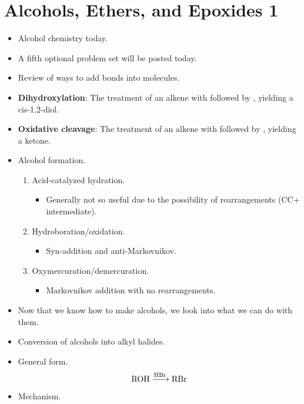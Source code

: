 \documentclass[../notes.tex]{subfiles}
\begin{document}
\section{Alcohols, Ethers, and Epoxides 1}
\begin{itemize}
    \item {}Alcohol chemistry today.
    \item A fifth optional problem set will be posted today.
    \item Review of ways to add  bonds into molecules.
    \item \textbf{Dihydroxylation}: The treatment of an alkene with  followed by , yielding a cis-1,2-diol.
    \item \textbf{Oxidative cleavage}: The treatment of an alkene with  followed by , yielding a ketone.
    \item Alcohol formation.
    \begin{enumerate}
        \item Acid-catalyzed hydration.
        \begin{itemize}
            \item Generally not so useful due to the possibility of rearrangements (CC+ intermediate).
        \end{itemize}
        \item Hydroboration/oxidation.
        \begin{itemize}
            \item Syn-addition and anti-Markovnikov.
        \end{itemize}
        \item Oxymercuration/demercuration.
        \begin{itemize}
            \item Markovnikov addition with no rearrangements.
        \end{itemize}
    \end{enumerate}
    \item Now that we know how to make alcohols, we look into what we can do with them.
    \item Conversion of alcohols into alkyl halides.
    \item General form.
    \begin{equation*}
        \ce{ROH ->[HBr] RBr}
    \end{equation*}
    \item Mechanism.
    \begin{itemize}

\end{itemize}
\end{itemize}
\end{document}
